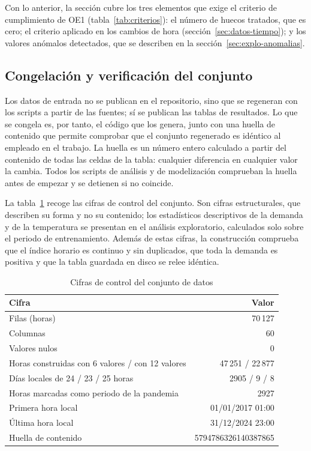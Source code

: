 Con lo anterior, la sección cubre los tres elementos que exige el criterio
de cumplimiento de OE1 (tabla~\ref{tab:criterios}): el número de huecos
tratados, que es cero; el criterio aplicado en los cambios de hora
(sección~\ref{sec:datos-tiempo}); y los valores anómalos detectados, que se
describen en la sección~\ref{sec:explo-anomalias}.

\subsection{Congelación y verificación del conjunto}\label{sec:datos-verificacion}

Los datos de entrada no se publican en el repositorio, sino que se regeneran
con los scripts a partir de las fuentes; sí se publican las tablas de
resultados. Lo que se congela es, por tanto, el código
que los genera, junto con una huella de contenido que permite comprobar que
el conjunto regenerado es idéntico al empleado en el trabajo. La huella es un
número entero calculado a partir del contenido de todas las celdas de la
tabla: cualquier diferencia en cualquier valor la cambia. Todos los scripts
de análisis y de modelización comprueban la huella antes de empezar y se
detienen si no coincide.

La tabla~\ref{tab:control} recoge las cifras de control del conjunto. Son
cifras estructurales, que describen su forma y no su contenido; los
estadísticos descriptivos de la demanda y de la temperatura se presentan en
el análisis exploratorio, calculados solo sobre el periodo de entrenamiento.
Además de estas cifras, la construcción comprueba que el índice horario es
continuo y sin duplicados, que toda la demanda es positiva y que la tabla
guardada en disco se relee idéntica.

\begin{table}[htbp]
	\centering
	\caption{Cifras de control del conjunto de datos}
	\label{tab:control}
	\small
	\begin{tabular}{lr}
		\hline
		\textbf{Cifra} & \textbf{Valor} \\
		\hline
		Filas (horas) & 70\,127 \\
		Columnas & 60 \\
		Valores nulos & 0 \\
		Horas construidas con 6 valores / con 12 valores & 47\,251 / 22\,877 \\
		Días locales de 24 / 23 / 25 horas & 2905 / 9 / 8 \\
		Horas marcadas como periodo de la pandemia & 2927 \\
		Primera hora local & 01/01/2017 01:00 \\
		Última hora local & 31/12/2024 23:00 \\
		Huella de contenido & 5794786326140387865 \\
		\hline
	\end{tabular}
\end{table}

